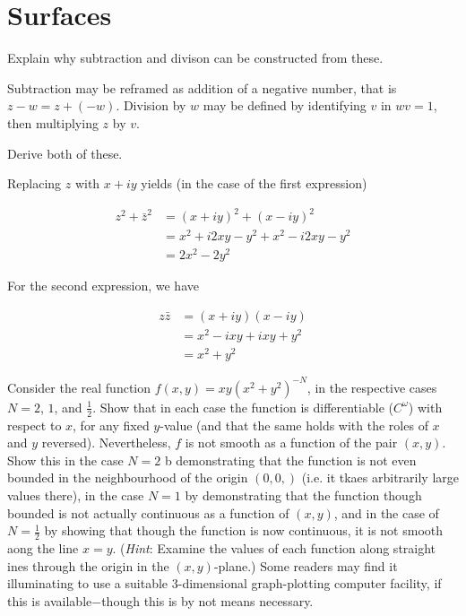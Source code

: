 \documentclass[../the-road-to-reality.tex]{subfiles}
\begin{document}
\section{Surfaces}

\begin{questions}

\question Explain why subtraction and divison can be constructed from these.

\begin{solution}
        Subtraction may be reframed as addition of a negative number, that is $z - w = z + (-w)$. Division by $w$ may be defined by identifying $v$ in $wv = 1$, then multiplying $z$ by $v$.
\end{solution}

\question Derive both of these.

\begin{solution}
        Replacing $z$ with $x + iy$ yields (in the case of the first expression)
        
        \begin{align*}
                z^2 + \bar{z}^2 &= (x + iy)^2 + (x - iy)^2 \\
                &= x^2 + i2xy - y^2 + x^2 - i2xy - y^2 \\
                &= 2x^2 - 2y^2
        \end{align*}
        
        For the second expression, we have
        
        \begin{align*}
                z\bar{z} &= (x + iy)(x - iy) \\
                &= x^2 - ixy + ixy + y^2 \\
                &= x^2 + y^2
        \end{align*}
\end{solution}

\question Consider the real function $f(x, y) = xy(x^2 + y^2)^{-N}$, in the respective cases $N = 2$, $1$, and $\frac{1}{2}$. Show that in each case the function is differentiable ($C^{\omega}$) with respect to $x$, for any fixed $y$-value (and that the same holds with the roles of $x$ and $y$ reversed). Nevertheless, $f$ is not smooth as a function of the pair $(x,y)$. Show this in the case $N=2$ b demonstrating that the function is not even bounded in the neighbourhood of the origin $(0, 0,)$ (i.e. it tkaes arbitrarily large values there), in the case $N = 1$ by demonstrating that the function though bounded is not actually continuous as a function of $(x, y)$, and in the case of $N = \frac{1}{2}$ by showing that though the function is now continuous, it is not smooth aong the line $x=y$. (\textit{Hint}: Examine the values of each function along straight ines through the origin in the $(x,y)$-plane.) Some readers may find it illuminating to use a suitable $3$-dimensional graph-plotting computer facility, if this is available$-$though this is by not means necessary.


\end{questions}
\end{document}
